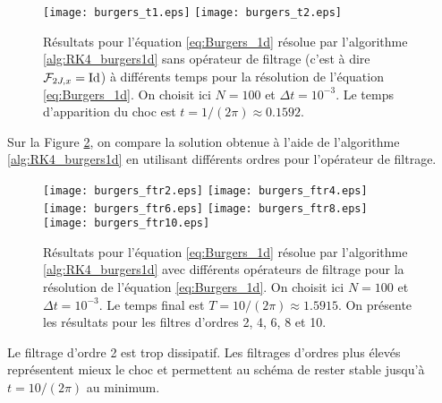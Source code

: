 \begin{figure}[htbp]
\begin{center}
\texttt{[image: burgers\_t1.eps]}
\texttt{[image: burgers\_t2.eps]}
\end{center}
\caption{Résultats pour l'équation \eqref{eq:Burgers_1d} résolue par l'algorithme \ref{alg:RK4_burgers1d} sans opérateur de filtrage (c'est à dire $\mathcal{F}_{2J,x} = \text{Id}$) à différents temps pour la résolution de l'équation \eqref{eq:Burgers_1d}. On choisit ici $N=100$ et $\Delta t = 10^{-3}$. Le temps d'apparition du choc est $t=1/(2\pi) \approx 0.1592$.}
\label{fig:comp_burgers}
\end{figure}

Sur la Figure \ref{fig:comp_burgers_ftr}, on compare la solution obtenue à l'aide de l'algorithme \ref{alg:RK4_burgers1d} en utilisant différents ordres pour l'opérateur de filtrage.

\begin{figure}[htbp]
\begin{center}
\texttt{[image: burgers\_ftr2.eps]}
\texttt{[image: burgers\_ftr4.eps]}\\
\texttt{[image: burgers\_ftr6.eps]}
\texttt{[image: burgers\_ftr8.eps]}\\
\texttt{[image: burgers\_ftr10.eps]}
\end{center}
\caption{Résultats pour l'équation \eqref{eq:Burgers_1d} résolue par l'algorithme \ref{alg:RK4_burgers1d} avec différents opérateurs de filtrage pour la résolution de l'équation \eqref{eq:Burgers_1d}. On choisit ici $N=100$ et $\Delta t = 10^{-3}$. Le temps final est $T= 10/(2\pi) \approx 1.5915$. On présente les résultats pour les filtres d'ordres 2, 4, 6, 8 et 10.}
\label{fig:comp_burgers_ftr}
\end{figure}

Le filtrage d'ordre 2 est trop dissipatif. Les filtrages d'ordres plus élevés représentent mieux le choc et permettent au schéma de rester stable jusqu'à $t=10/(2 \pi)$ au minimum.


































